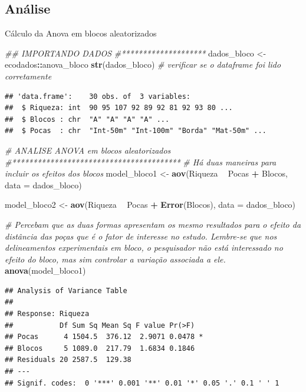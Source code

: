 \documentclass[
]{book}
\newenvironment{Shaded}{\begin{snugshade}}{\end{snugshade}}
\newcommand{\CommentTok}[1]{\textcolor[rgb]{0.56,0.35,0.01}{\textit{#1}}}
\newcommand{\DataTypeTok}[1]{\textcolor[rgb]{0.13,0.29,0.53}{#1}}
\newcommand{\KeywordTok}[1]{\textcolor[rgb]{0.13,0.29,0.53}{\textbf{#1}}}
\newcommand{\NormalTok}[1]{#1}
\newcommand{\OperatorTok}[1]{\textcolor[rgb]{0.81,0.36,0.00}{\textbf{#1}}}
\newcommand{\StringTok}[1]{\textcolor[rgb]{0.31,0.60,0.02}{#1}}
\begin{document}
\hypertarget{anuxe1lise-8}{%
\subsection{Análise}\label{anuxe1lise-8}}

Cálculo da Anova em blocos aleatorizados

\begin{Shaded}
\begin{Highlighting}[]
\CommentTok{## IMPORTANDO DADOS}
\CommentTok{#********************}
\NormalTok{dados_bloco <-}\StringTok{ }\NormalTok{ecodados}\OperatorTok{::}\NormalTok{anova_bloco}
\KeywordTok{str}\NormalTok{(dados_bloco) }\CommentTok{# verificar se o dataframe foi lido corretamente}
\end{Highlighting}
\end{Shaded}

\begin{verbatim}
## 'data.frame':	30 obs. of  3 variables:
##  $ Riqueza: int  90 95 107 92 89 92 81 92 93 80 ...
##  $ Blocos : chr  "A" "A" "A" "A" ...
##  $ Pocas  : chr  "Int-50m" "Int-100m" "Borda" "Mat-50m" ...
\end{verbatim}

\begin{Shaded}
\begin{Highlighting}[]
\CommentTok{# ANALISE ANOVA em blocos aleatorizados}
\CommentTok{#****************************************}
\CommentTok{# Há duas maneiras para incluir os efeitos dos blocos}
\NormalTok{model_bloco1 <-}\StringTok{ }\KeywordTok{aov}\NormalTok{(Riqueza }\OperatorTok{~}\StringTok{ }\NormalTok{Pocas }\OperatorTok{+}\StringTok{ }\NormalTok{Blocos, }\DataTypeTok{data =}\NormalTok{ dados_bloco)}

\NormalTok{model_bloco2 <-}\StringTok{ }\KeywordTok{aov}\NormalTok{(Riqueza }\OperatorTok{~}\StringTok{ }\NormalTok{Pocas }\OperatorTok{+}\StringTok{ }\KeywordTok{Error}\NormalTok{(Blocos), }\DataTypeTok{data =}\NormalTok{ dados_bloco)}

\CommentTok{# Percebam que as duas formas apresentam os mesmo resultados para o efeito da distância das poças que é o fator de interesse no estudo. Lembre-se que nos delineamentos experimentais em bloco, o pesquisador não está interessado no efeito do bloco, mas sim controlar a variação associada a ele.}
\KeywordTok{anova}\NormalTok{(model_bloco1)}
\end{Highlighting}
\end{Shaded}

\begin{verbatim}
## Analysis of Variance Table
## 
## Response: Riqueza
##           Df Sum Sq Mean Sq F value Pr(>F)  
## Pocas      4 1504.5  376.12  2.9071 0.0478 *
## Blocos     5 1089.0  217.79  1.6834 0.1846  
## Residuals 20 2587.5  129.38                 
## ---
## Signif. codes:  0 '***' 0.001 '**' 0.01 '*' 0.05 '.' 0.1 ' ' 1
\end{verbatim}
\end{document}
